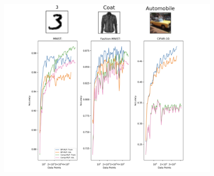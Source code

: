 \documentclass[dvipsnames, usenames]{beamer}
\begin{document}
\begin{frame}[noframenumbering]
	\begin{figure}
		\centering
		\includegraphics[width=\textwidth]{../figures/report/p1_2}
	\end{figure}
\end{frame}


\end{document}
